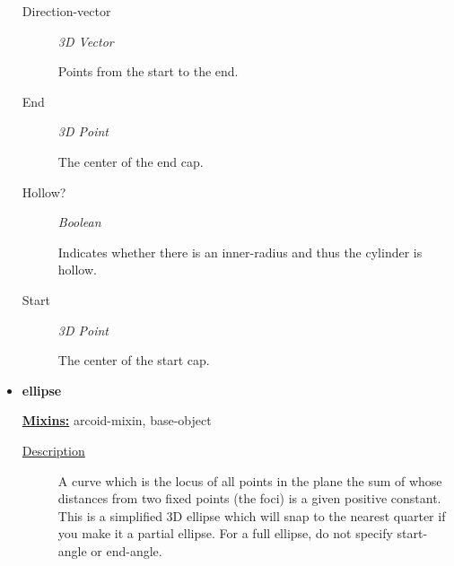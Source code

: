 \documentclass [11pt]{book}
\begin{document}
\begin{itemize}
\begin{description}
\item [Direction-vector]
\emph{3D Vector}

 Points from the start to the end.




\item [End]
\emph{3D Point}

 The center of the end cap.




\item [Hollow?]
\emph{Boolean}

 Indicates whether there is an inner-radius and thus the cylinder is hollow.




\item [Start]
\emph{3D Point}

 The center of the start cap.




\end{description}







\item {}
\label{prim:ellipse}
\textbf{ellipse}


\textbf{
\underline{Mixins:}} arcoid-mixin, base-object





\begin{description}

\item [
\underline{Description}]


A curve which is the locus of all points in the plane 
the sum of whose distances from two fixed points (the foci) is a given positive constant.
This is a simplified 3D ellipse which will snap to the nearest quarter if you make it a 
partial ellipse. For a full ellipse, do not specify start-angle or end-angle.



\end{description}




\begin{figure}
\begin{lrbox}{\boxedverb}
\begin{minipage}{\linewidth}
{\small

}
\end{minipage}
\end{lrbox}
\end{figure}
\end{itemize}
\end{document}
